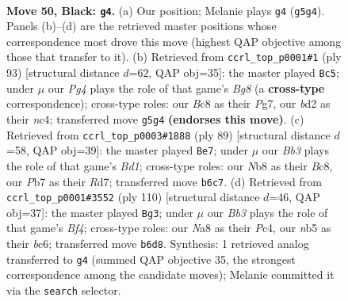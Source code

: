 \documentclass[11pt]{article}
\begin{document}
\clearpage

\begin{figure}[p]\centering
\begin{subfigure}{0.46\textwidth}\centering
\resizebox{\linewidth}{!}{%
\newchessgame
\chessboard[
  setfen={nnb5/1p4k1/1b6/pN1p2p1/7p/PP2P2P/3BP1K1/3B4 b - - 13 50},
  showmover=false,
  pgfstyle=straightmove, color=movearrow, markmove={g5-g4}
]}
\caption{}
\end{subfigure}\hfill
\begin{subfigure}{0.46\textwidth}\centering
\resizebox{\linewidth}{!}{%
\newchessgame
\chessboard[
  setfen={4bk2/6p1/1p2p3/pP2P2p/P1N1BK1P/8/6P1/6b1 b - - 0 47},
  showmover=false,
  pgfstyle=straightmove, color=movearrow, markmove={g1-c5}
]}
\caption{}
\end{subfigure}
\\[4pt]
\begin{subfigure}{0.46\textwidth}\centering
\resizebox{\linewidth}{!}{%
\newchessgame
\chessboard[
  setfen={2bb1k2/3r4/3p2p1/1p1P2Pp/pP2NB1P/6K1/1P6/3R4 b - - 0 45},
  showmover=false,
  pgfstyle=straightmove, color=movearrow, markmove={d8-e7}
]}
\caption{}
\end{subfigure}\hfill
\begin{subfigure}{0.46\textwidth}\centering
\resizebox{\linewidth}{!}{%
\newchessgame
\chessboard[
  setfen={8/5pk1/2b1p2p/4P2P/p1P1pBP1/8/Pb1K4/3B4 w - - 0 56},
  showmover=false,
  pgfstyle=straightmove, color=movearrow, markmove={f4-g3}
]}
\caption{}
\end{subfigure}
\caption{\textbf{Move 50, Black: \texttt{g4}.} (a) Our position; Melanie plays \texttt{g4} (\texttt{g5g4}). Panels (b)--(d) are the retrieved master positions whose correspondence most drove this move (highest QAP objective among those that transfer to it). (b) Retrieved from \texttt{ccrl\_top\_p0001\#1} (ply 93) [structural distance $d$=62, QAP obj=35]: the master played \texttt{Bc5}; under $\mu$ our \emph{Pg4} plays the role of that game's \emph{Bg8} (a \textbf{cross-type} correspondence); cross-type roles: our \emph{B}c8 as their \emph{P}g7, our \emph{b}d2 as their \emph{n}c4; transferred move \texttt{g5g4} \textbf{(endorses this move)}. (c) Retrieved from \texttt{ccrl\_top\_p0003\#1888} (ply 89) [structural distance $d$=58, QAP obj=39]: the master played \texttt{Be7}; under $\mu$ our \emph{Bb3} plays the role of that game's \emph{Bd1}; cross-type roles: our \emph{N}b8 as their \emph{B}c8, our \emph{P}b7 as their \emph{R}d7; transferred move \texttt{b6c7}. (d) Retrieved from \texttt{ccrl\_top\_p0001\#3552} (ply 110) [structural distance $d$=46, QAP obj=37]: the master played \texttt{Bg3}; under $\mu$ our \emph{Bb3} plays the role of that game's \emph{Bf4}; cross-type roles: our \emph{N}a8 as their \emph{P}c4, our \emph{n}b5 as their \emph{b}c6; transferred move \texttt{b6d8}. Synthesis: 1 retrieved analog transferred to \texttt{g4} (summed QAP objective 35, the strongest correspondence among the candidate moves); Melanie committed it via the \texttt{search} selector.}
\label{fig:thought-m99}
\end{figure}
\end{document}
